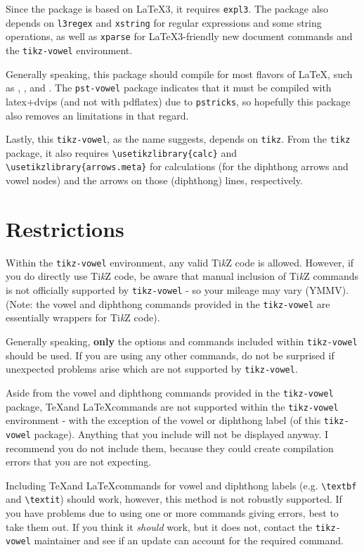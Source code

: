 \documentclass{article}
\newcommand{\pkg}[1]{\texttt{#1}}
\newcommand{\pdfLaTeX}{\hologo{pdfLaTeX}\xspace}
\newcommand{\TikZ}{Ti\textit{k}Z\xspace}
\begin{document}
Since the package is based on \LaTeX3, it requires \pkg{expl3}.  The package also depends on \pkg{l3regex} and \pkg{xstring} for regular expressions and some string operations, as well as \pkg{xparse} for \LaTeX3-friendly new document commands and the \verb|tikz-vowel| environment.

Generally speaking, this package should compile for most flavors of \LaTeX, such as \pdfLaTeX, \LuaLaTeX, and \XeLaTeX.  The \pkg{pst-vowel} package indicates that it must be compiled with latex+dvips (and not with pdflatex) due to \pkg{pstricks}, so hopefully this package also removes an limitations in that regard.

Lastly, this \pkg{tikz-vowel}, as the name suggests, depends on \pkg{tikz}.  From the \pkg{tikz} package, it also requires \verb|\usetikzlibrary{calc}| and \verb|\usetikzlibrary{arrows.meta}| for calculations (for the diphthong arrows and vowel nodes) and the arrows on those (diphthong) lines, respectively.


\section{Restrictions}
\label{sec:Restrictions}

Within the \verb|tikz-vowel| environment, any valid \TikZ code is allowed.  However, if you do directly use \TikZ code, be aware that manual inclusion of \TikZ commands is not officially supported by \pkg{tikz-vowel} - so your mileage may vary (YMMV).  (Note: the vowel and diphthong commands provided in the \pkg{tikz-vowel} are essentially wrappers for \TikZ code).

Generally speaking, \textbf{only} the options and commands included within \pkg{tikz-vowel} should be used.  If you are using any other commands, do not be surprised if unexpected problems arise which are not supported by \pkg{tikz-vowel}.

Aside from the vowel and diphthong commands provided in the \pkg{tikz-vowel} package, \TeX and \LaTeX commands are not supported within the \verb|tikz-vowel| environment - with the exception of the vowel or diphthong label (of this \pkg{tikz-vowel} package).  Anything that you include will not be displayed anyway.  I recommend you do not include them, because they could create compilation errors that you are not expecting.

Including \TeX and \LaTeX commands for vowel and diphthong labels (e.g. \verb|\textbf| and \verb|\textit|) should work, however, this method is not robustly supported.  If you have problems due to using one or more commands giving errors, best to take them out.  If you think it \textit{should} work, but it does not, contact the \pkg{tikz-vowel} maintainer and see if an update can account for the required command.
\end{document}
